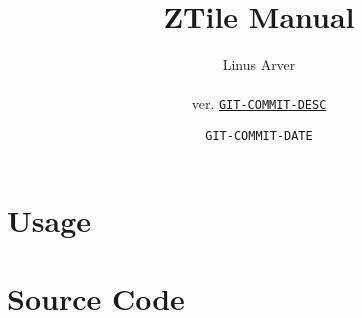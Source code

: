 \documentclass[letterpaper,twoside,12pt]{report}
\begin{document}
\title{ZTile Manual}
\author{Linus Arver\\
\\
ver. \href{http://www.github.com/listx/ztile/commit/GIT-COMMIT-HASH}{\texttt{GIT-COMMIT-DESC}}
}
\date{\texttt{GIT-COMMIT-DATE}}
\maketitle{}
\tableofcontents{}
\part{Usage}


\part{Source Code}




\end{document}
